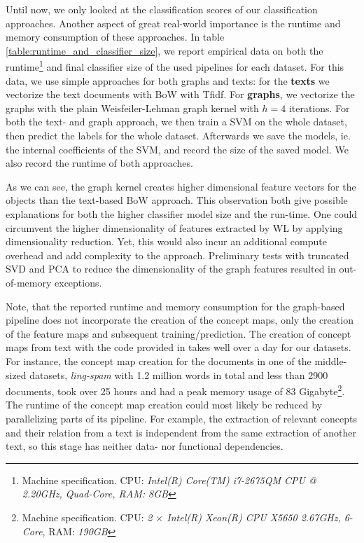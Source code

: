 Until now, we only looked at the classification scores of our classification approaches.
Another aspect of great real-world importance is the runtime and memory consumption of these approaches.
In table \ref{table:runtime_and_classifier_size}, we report empirical data on both the runtime\footnote{Machine specification. CPU: \textit{Intel(R) Core(TM) i7-2675QM CPU @ 2.20GHz, Quad-Core, RAM: \textit{8GB}}} and final classifier size of the used pipelines for each dataset.
For this data, we use simple approaches for both graphs and texts: for the \textbf{texts} we vectorize the text documents with BoW with Tfidf.
For \textbf{graphs}, we vectorize the graphs with the plain Weisfeiler-Lehman graph kernel with $h = 4$ iterations.
For both the text- and graph approach, we then train a SVM on the whole dataset, then predict the labels for the whole dataset. Afterwards we save the models, ie. the internal coefficients of the SVM, and record the size of the saved model.
We also record the runtime of both approaches.

As we can see, the graph kernel creates higher dimensional feature vectors for the objects than the text-based BoW approach. 
This observation both give possible explanations for both the higher classifier model size and the run-time.
One could circumvent the higher dimensionality of features extracted by WL by applying dimensionality reduction.
Yet, this would also incur an additional compute overhead and add complexity to the approach.
Preliminary tests with truncated SVD \cite{Mathematics2009} and PCA \cite{Jolliffe2002} to reduce the dimensionality of the graph features resulted in out-of-memory exceptions.

Note, that the reported runtime and memory consumption for the graph-based pipeline does not incorporate the creation of the concept maps, only the creation of the feature maps and subsequent training/prediction.
The creation of concept maps from text with the code provided in \cite{Falke2017b} takes well over a day for our datasets.
For instance, the concept map creation for the documents  in one of the middle-sized datasets, \textit{ling-spam} with 1.2 million words in total and less than 2900 documents, took over 25 hours and had a peak memory usage of 83 Gigabyte\footnote{Machine specification. CPU: \textit{2 $\times$ Intel(R) Xeon(R) CPU X5650 \@ 2.67GHz, 6-Core}, RAM: \textit{190GB}}.
The runtime of the concept map creation could most likely be reduced by parallelizing parts of its pipeline.
For example, the extraction of relevant concepts and their relation from a text is independent from the same extraction of another text, so this stage has neither data- nor functional dependencies.

